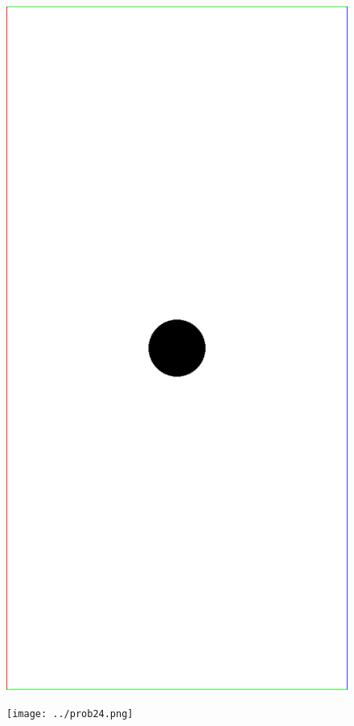 \documentclass{article}
\begin{document}
\begin{figure}
\centering
\begin{minipage}{.5\textwidth}
  \centering
  \includegraphics[width=.5\linewidth]{../prob1HR.png}
  \label{fig:test1}
\end{minipage}%
\begin{minipage}{.5\textwidth}
  \centering
  \texttt{[image: ../prob24.png]}
  \label{fig:test2}
\end{minipage}
\end{figure}
\end{document}
